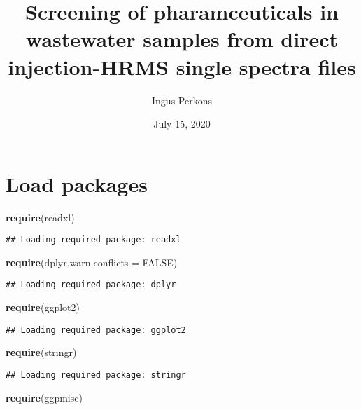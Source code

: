 \documentclass[]{article}
\title{Screening of pharamceuticals in wastewater samples from direct
injection-HRMS single spectra files}
\author{Ingus Perkons}
\date{July 15, 2020}
\newenvironment{Shaded}{\begin{snugshade}}{\end{snugshade}}
\newcommand{\KeywordTok}[1]{\textcolor[rgb]{0.13,0.29,0.53}{\textbf{#1}}}
\newcommand{\DataTypeTok}[1]{\textcolor[rgb]{0.13,0.29,0.53}{#1}}
\newcommand{\OtherTok}[1]{\textcolor[rgb]{0.56,0.35,0.01}{#1}}
\newcommand{\NormalTok}[1]{#1}
\begin{document}
\maketitle

\section{Load packages}\label{load-packages}

\begin{Shaded}
\begin{Highlighting}[]
\KeywordTok{require}\NormalTok{(readxl)}
\end{Highlighting}
\end{Shaded}

\begin{verbatim}
## Loading required package: readxl
\end{verbatim}

\begin{Shaded}
\begin{Highlighting}[]
\KeywordTok{require}\NormalTok{(dplyr,}\DataTypeTok{warn.conflicts =} \OtherTok{FALSE}\NormalTok{)}
\end{Highlighting}
\end{Shaded}

\begin{verbatim}
## Loading required package: dplyr
\end{verbatim}

\begin{Shaded}
\begin{Highlighting}[]
\KeywordTok{require}\NormalTok{(ggplot2)}
\end{Highlighting}
\end{Shaded}

\begin{verbatim}
## Loading required package: ggplot2
\end{verbatim}

\begin{Shaded}
\begin{Highlighting}[]
\KeywordTok{require}\NormalTok{(stringr)}
\end{Highlighting}
\end{Shaded}

\begin{verbatim}
## Loading required package: stringr
\end{verbatim}

\begin{Shaded}
\begin{Highlighting}[]
\KeywordTok{require}\NormalTok{(ggpmisc)}
\end{Highlighting}
\end{Shaded}
\end{document}
